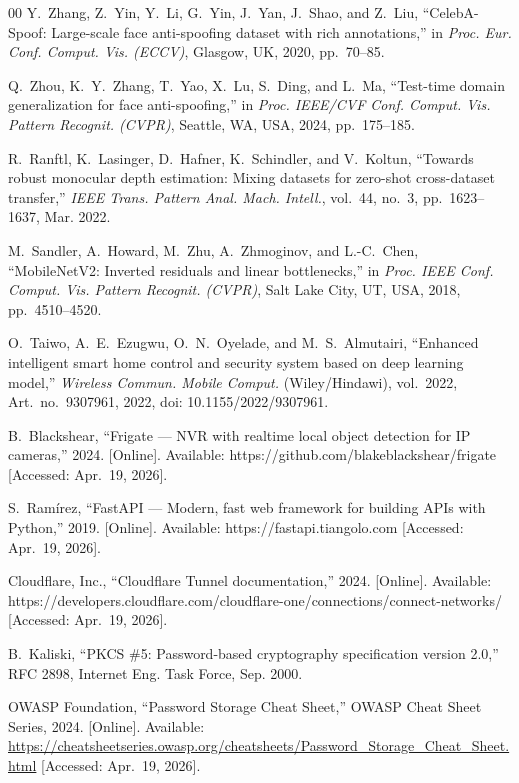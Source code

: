 \documentclass{ieeeaccess}
\begin{document}
\begin{thebibliography}{00}
 Y.~Zhang, Z.~Yin, Y.~Li, G.~Yin, J.~Yan, J.~Shao, and Z.~Liu, ``CelebA-Spoof: Large-scale face anti-spoofing dataset with rich annotations,'' in \emph{Proc. Eur. Conf. Comput. Vis. (ECCV)}, Glasgow, UK, 2020, pp.~70--85.

 Q.~Zhou, K.~Y.~Zhang, T.~Yao, X.~Lu, S.~Ding, and L.~Ma, ``Test-time domain generalization for face anti-spoofing,'' in \emph{Proc. IEEE/CVF Conf. Comput. Vis. Pattern Recognit. (CVPR)}, Seattle, WA, USA, 2024, pp.~175--185.

 R.~Ranftl, K.~Lasinger, D.~Hafner, K.~Schindler, and V.~Koltun, ``Towards robust monocular depth estimation: Mixing datasets for zero-shot cross-dataset transfer,'' \emph{IEEE Trans. Pattern Anal. Mach. Intell.}, vol.~44, no.~3, pp.~1623--1637, Mar. 2022.

 M.~Sandler, A.~Howard, M.~Zhu, A.~Zhmoginov, and L.-C.~Chen, ``MobileNetV2: Inverted residuals and linear bottlenecks,'' in \emph{Proc. IEEE Conf. Comput. Vis. Pattern Recognit. (CVPR)}, Salt Lake City, UT, USA, 2018, pp.~4510--4520.

 O.~Taiwo, A.~E.~Ezugwu, O.~N.~Oyelade, and M.~S.~Almutairi, ``Enhanced intelligent smart home control and security system based on deep learning model,'' \emph{Wireless Commun. Mobile Comput.} (Wiley/Hindawi), vol.~2022, Art.~no.~9307961, 2022, doi: 10.1155/2022/9307961.

 B.~Blackshear, ``Frigate --- NVR with realtime local object detection for IP cameras,'' 2024. [Online]. Available: https://github.com/blakeblackshear/frigate [Accessed: Apr.~19, 2026].

 S.~Ram\'{i}rez, ``FastAPI --- Modern, fast web framework for building APIs with Python,'' 2019. [Online]. Available: https://fastapi.tiangolo.com [Accessed: Apr.~19, 2026].

 Cloudflare, Inc., ``Cloudflare Tunnel documentation,'' 2024. [Online]. Available: https://developers.cloudflare.com/cloudflare-one/connections/connect-networks/ [Accessed: Apr.~19, 2026].

 B.~Kaliski, ``PKCS \#5: Password-based cryptography specification version 2.0,'' RFC 2898, Internet Eng. Task Force, Sep. 2000.

 OWASP Foundation, ``Password Storage Cheat Sheet,'' OWASP Cheat Sheet Series, 2024. [Online]. Available: \url{https://cheatsheetseries.owasp.org/cheatsheets/Password_Storage_Cheat_Sheet.html} [Accessed: Apr.~19, 2026].


\end{thebibliography}
\end{document}
